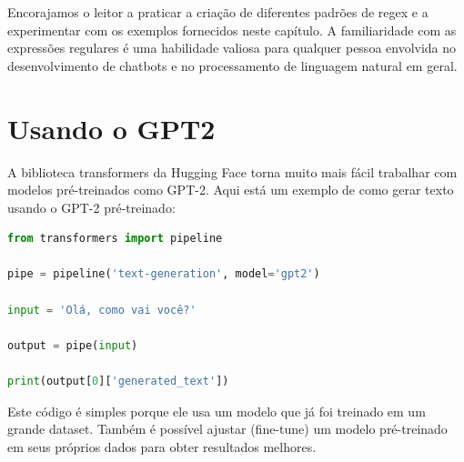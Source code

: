 \documentclass[14pt,a4paper,oneside]{book}
\begin{document}
Encorajamos o leitor a praticar a criação de diferentes padrões de regex e a experimentar com os exemplos fornecidos neste capítulo. A familiaridade com as expressões regulares é uma habilidade valiosa para qualquer pessoa envolvida no desenvolvimento de chatbots e no processamento de linguagem natural em geral.



\chapter{Usando o GPT2}

A biblioteca transformers da Hugging Face torna muito mais fácil trabalhar com modelos pré-treinados como GPT-2. Aqui está um exemplo de como gerar texto usando o GPT-2 pré-treinado:

\begin{lstlisting}[language=Python, caption=Exemplo de uso do GPT-2 com a biblioteca transformers, label=lst:gpt2_exemplo]
from transformers import pipeline

pipe = pipeline('text-generation', model='gpt2')

input = 'Olá, como vai você?'

output = pipe(input)

print(output[0]['generated_text'])
\end{lstlisting}

Este código é simples porque ele usa um modelo que já foi treinado em um grande dataset. Também é possível ajustar (fine-tune) um modelo pré-treinado em seus próprios dados para obter resultados melhores.




\end{document}
